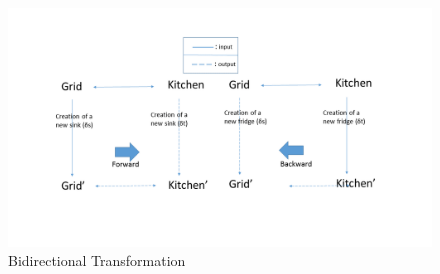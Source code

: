 \begin{figure}
	\includegraphics[width=1\textwidth]{figures/BX}
	\caption{Bidirectional Transformation}
	\label{fig:BX_Diagram}
\end{figure}

 



